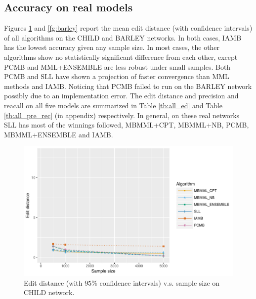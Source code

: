 \documentclass{svmult}
\begin{document}
\subsection{Accuracy on real models}
\label{sec:exp_real}
Figures \ref{fg:child} and \ref{fg:barley} report the mean edit distance (with confidence intervals) of all algorithms on the CHILD and BARLEY networks. In both cases, IAMB has the lowest accuracy given any sample size. In most cases, the other algorithms show no statistically significant difference from each other, except PCMB and MML+ENSEMBLE are less robust under small samples. Both PCMB and SLL have shown a projection of faster convergence than MML methods and IAMB. Noticing that PCMB failed to run on the BARLEY network possibly due to an implementation error. The edit distance and precision and reacall on all five models are summarized in Table \ref{tb:all_ed} and Table \ref{tb:all_pre_rec} (in appendix) respectively. In general, on these real networks SLL has most of the winnings followed, MBMML+CPT, MBMML+NB, PCMB, MBMML+ENSEMBLE and IAMB. 
\begin{figure}[htb]
  \centering
    \includegraphics[scale=0.6]{figures/ed_vs_samplesize_child.pdf}
  \caption{Edit distance (with $95\%$ confidence intervals) v.s. sample size on CHILD network.}
  \label{fg:child}
\end{figure}
\end{document}
